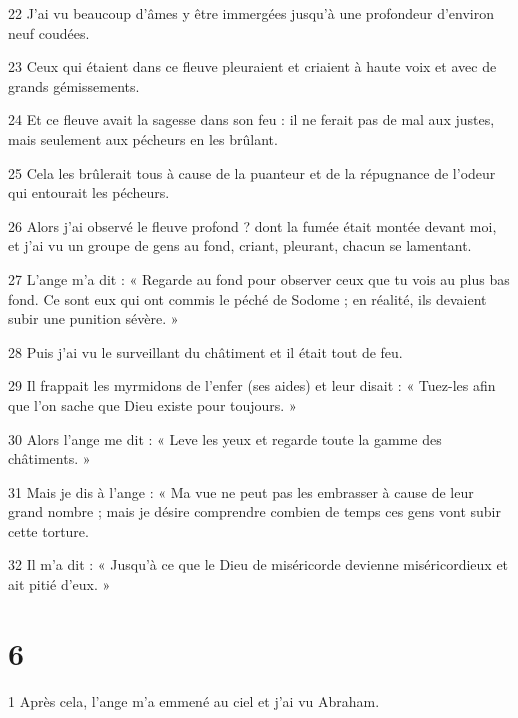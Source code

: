 \par 22 J'ai vu beaucoup d'âmes y être immergées jusqu'à une profondeur d'environ neuf coudées.

\par 23 Ceux qui étaient dans ce fleuve pleuraient et criaient à haute voix et avec de grands gémissements.

\par 24 Et ce fleuve avait la sagesse dans son feu : il ne ferait pas de mal aux justes, mais seulement aux pécheurs en les brûlant.

\par 25 Cela les brûlerait tous à cause de la puanteur et de la répugnance de l'odeur qui entourait les pécheurs.

\par 26 Alors j'ai observé le fleuve profond ? dont la fumée était montée devant moi, et j'ai vu un groupe de gens au fond, criant, pleurant, chacun se lamentant.

\par 27 L'ange m'a dit : « Regarde au fond pour observer ceux que tu vois au plus bas fond. Ce sont eux qui ont commis le péché de Sodome ; en réalité, ils devaient subir une punition sévère. »

\par 28 Puis j'ai vu le surveillant du châtiment et il était tout de feu.

\par 29 Il frappait les myrmidons de l'enfer (ses aides) et leur disait : « Tuez-les afin que l'on sache que Dieu existe pour toujours. »

\par 30 Alors l'ange me dit : « Leve les yeux et regarde toute la gamme des châtiments. »

\par 31 Mais je dis à l'ange : « Ma vue ne peut pas les embrasser à cause de leur grand nombre ; mais je désire comprendre combien de temps ces gens vont subir cette torture.

\par 32 Il m'a dit : « Jusqu'à ce que le Dieu de miséricorde devienne miséricordieux et ait pitié d'eux. »

\chapter{6}

\par 1 Après cela, l'ange m'a emmené au ciel et j'ai vu Abraham.

